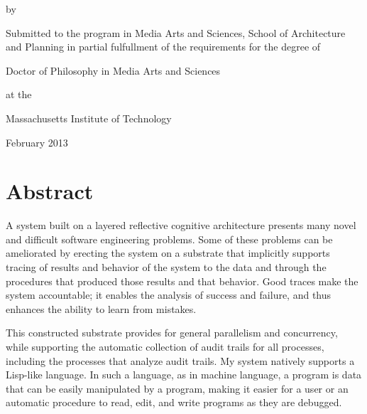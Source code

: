 \begingroup
\let\clearpage\relax
\let\cleardoublepage\relax
\let\cleardoublepage\relax

\begin{center}
    \begingroup
        \color{Maroon}
        {\Large\textsc{\myTitle}}
    \endgroup

    by

    \myName

    \vspace{4mm}

 Submitted to the program in Media Arts and Sciences, School of
 Architecture and Planning in partial fulfullment of the requirements
 for the degree of

    \vspace{2mm}

Doctor of Philosophy in Media Arts and Sciences

at the

Massachusetts Institute of Technology

    \vspace{2mm}

February 2013

\vspace{-4mm}

\end{center}


\chapter*{Abstract}

A system built on a layered reflective cognitive architecture presents
many novel and difficult software engineering problems.  Some of these
problems can be ameliorated by erecting the system on a substrate that
implicitly supports tracing of results and behavior of the system to
the data and through the procedures that produced those results and
that behavior.  Good traces make the system accountable; it enables
the analysis of success and failure, and thus enhances the ability to
learn from mistakes.

This constructed substrate provides for general parallelism and
concurrency, while supporting the automatic collection of audit trails
for all processes, including the processes that analyze audit trails.
My system natively supports a Lisp-like language.  In such a language,
as in machine language, a program is data that can be easily
manipulated by a program, making it easier for a user or an automatic
procedure to read, edit, and write programs as they are debugged.

